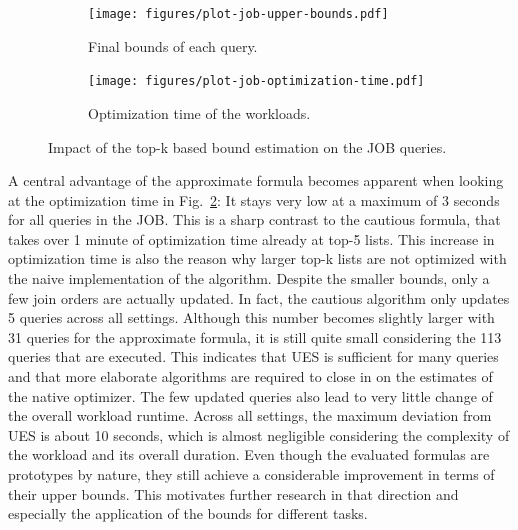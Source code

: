 \begin{figure}[tb]
	\centering
	\begin{subfigure}[b]{0.47\textwidth}
	    \centering
	    \texttt{[image: figures/plot-job-upper-bounds.pdf]}
	    \caption{Final bounds of each query.}
	    \label{fig:results-topk-upper-bounds}
	\end{subfigure}
	\begin{subfigure}[b]{0.47\textwidth}
	    \centering
	    \texttt{[image: figures/plot-job-optimization-time.pdf]}
	    \caption{Optimization time of the workloads.}
	    \label{fig:results-topk-optimization-time}
	\end{subfigure}
	\caption{Impact of the top-k based bound estimation on the JOB queries.}
	\label{fig:results-topk}
	\vspace{-0.4cm}
\end{figure}

A central advantage of the approximate formula becomes apparent when looking at the optimization time in Fig.~\ref{fig:results-topk-optimization-time}: It stays very low at a maximum of 3 seconds for all queries in the JOB. 
This is a sharp contrast to the cautious formula, that takes over 1 minute of optimization time already at top-5 lists. 
This increase in optimization time is also the reason why larger top-k lists are not optimized with the naive implementation of the algorithm.
Despite the smaller bounds, only a few join orders are actually updated. 
In fact, the cautious algorithm only updates 5 queries across all settings. 
Although this number becomes slightly larger with 31 queries for the approximate formula, it is still quite small considering the 113 queries that are executed. 
This indicates that UES is sufficient for many queries and that more elaborate algorithms are required to close in on the estimates of the native optimizer. 
The few updated queries also lead to very little change of the overall workload runtime. 
Across all settings, the maximum deviation from UES is about 10 seconds, which is almost negligible considering the complexity of the workload and its overall duration.
Even though the evaluated formulas are prototypes by nature, they still achieve a considerable improvement in terms of their upper bounds. 
This motivates further research in that direction and especially the application of the bounds for different tasks.

